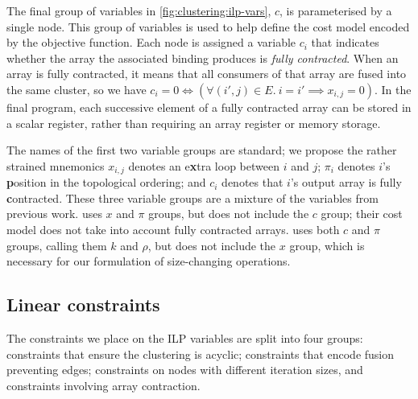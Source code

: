 The final group of variables in \cref{fig:clustering:ilp-vars}, $c$, is parameterised by a single node.
This group of variables is used to help define the cost model encoded by the objective function.
Each node is assigned a variable $c_i$ that indicates whether the array the associated binding produces is \emph{fully contracted}.
When an array is fully contracted, it means that all consumers of that array are fused into the same cluster, so we have $c_i = 0 \iff (\forall (i',j) \in E.\ i = i' \implies x_{i,j} = 0)$.
In the final program, each successive element of a fully contracted array can be stored in a scalar register, rather than requiring an array register or memory storage. 

The names of the first two variable groups are standard; we propose the rather strained mnemonics $x_{i,j}$ denotes an e{\bf x}tra loop between $i$ and $j$; $\pi_i$ denotes $i$'s {\bf p}osition in the topological ordering; and $c_i$ denotes that $i$'s output array is fully {\bf c}ontracted.
These three variable groups are a mixture of the variables from previous work.
\citet{megiddo1998optimal} uses $x$ and $\pi$ groups, but does not include the $c$ group; their cost model does not take into account fully contracted arrays.
\citet{darte2002contraction} uses both $c$ and $\pi$ groups, calling them $k$ and $\rho$, but does not include the $x$ group, which is necessary for our formulation of size-changing operations.


\subsection{Linear constraints}
\label{clustering:s:LinearConstraints}
The constraints we place on the ILP variables are split into four groups: constraints that ensure the clustering is acyclic; constraints that encode fusion preventing edges; constraints on nodes with different iteration sizes, and constraints involving array contraction. 



